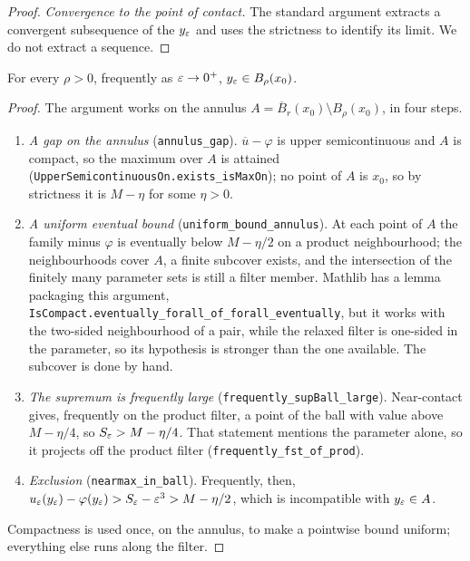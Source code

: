 \begin{proof}
\leanok
{}
\emph{Convergence to the point of contact.} The standard argument extracts a
convergent subsequence of the $y_\varepsilon$ and uses the strictness to identify its
limit. We do not extract a sequence.
\end{proof}


\begin{theorem}\label{thm:nearfreq}
\leanok
For every $\rho > 0$, frequently as $\varepsilon \to 0^+$, $y_\varepsilon \in B_\rho(x_0)$.
\end{theorem}

\begin{proof}
\leanok
{}
The argument works on the annulus
$A = \overline{B}_r(x_0) \setminus B_\rho(x_0)$, in four steps.
\begin{enumerate}
  \item \emph{A gap on the annulus} (\texttt{annulus\_gap}).
        $\overline{u} - \varphi$ is upper semicontinuous and $A$ is compact, so
        the maximum over $A$ is attained
        (\texttt{UpperSemicontinuousOn.exists\_isMaxOn}); no point of $A$ is
        $x_0$, so by strictness it is $M - \eta$ for some $\eta > 0$.
  \item \emph{A uniform eventual bound} (\texttt{uniform\_bound\_annulus}).
        At each point of $A$ the family minus $\varphi$ is eventually below
        $M - \eta/2$ on a product neighbourhood; the neighbourhoods cover $A$,
        a finite subcover exists, and the intersection of the finitely many
        parameter sets is still a filter member. Mathlib has a lemma
        packaging this argument, \texttt{IsCompact.eventually\_forall\_of\_forall\_eventually},
        but it works with the two-sided neighbourhood of a pair, while the
        relaxed filter is one-sided in the parameter, so its hypothesis is
        stronger than the one available. The subcover is done by hand.
  \item \emph{The supremum is frequently large}
        (\texttt{frequently\_supBall\_large}). Near-contact gives, frequently
        on the product filter, a point of the ball with value above
        $M - \eta/4$, so $S_\varepsilon > M - \eta/4$. That statement mentions the
        parameter alone, so it projects off the product filter
        (\texttt{frequently\_fst\_of\_prod}).
  \item \emph{Exclusion} (\texttt{nearmax\_in\_ball}). Frequently, then,
        $u_\varepsilon(y_\varepsilon) - \varphi(y_\varepsilon) > S_\varepsilon - \varepsilon^3 > M - \eta/2$,
        which is incompatible with $y_\varepsilon \in A$.
\end{enumerate}
Compactness is used once, on the annulus, to make a pointwise bound uniform;
everything else runs along the filter.
\end{proof}


